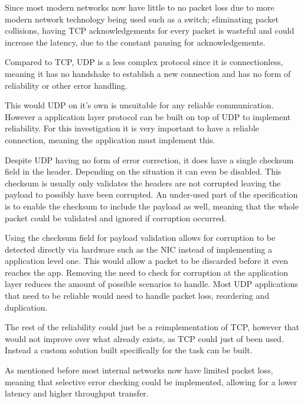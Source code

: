 Since most modern networks now have little to no packet loss due to more modern network technology being used such as a switch; eliminating packet collisions, having TCP acknowledgements for every packet is wasteful and could increase the latency, due to the constant pausing for acknowledgements.

Compared to TCP, UDP is a less complex protocol since it is connectionless, meaning it has no handshake to establish a new connection and has no form of reliability or other error handling.

This would UDP on it's own is unsuitable for any reliable communication. However a application layer protocol can be built on top of UDP to implement reliability. For this investigation it is very important to have a reliable connection, meaning the application must implement this.

Despite UDP having no form of error correction, it does have a single checksum field in the header. Depending on the situation it can even be disabled. This checksum is usually only validates the headers are not corrupted leaving the payload to possibly have been corrupted. An under-used part of the specification is to enable the checksum to include the payload as well, meaning that the whole packet could be validated and ignored if corruption occurred.

Using the checksum field for payload validation allows for corruption to be detected directly via hardware such as the NIC instead of implementing a application level one. This would allow a packet to be discarded before it even reaches the app. Removing the need to check for corruption at the application layer reduces the amount of possible scenarios to handle. Most UDP applications that need to be reliable would need to handle packet loss, reordering and duplication.

The rest of the reliability could just be a reimplementation of TCP, however that would not improve over what already exists, as TCP could just of been used. Instead a custom solution built specifically for the task can be built.

As mentioned before most internal networks now have limited packet loss, meaning that selective error checking could be implemented, allowing for a lower latency and higher throughput transfer.
